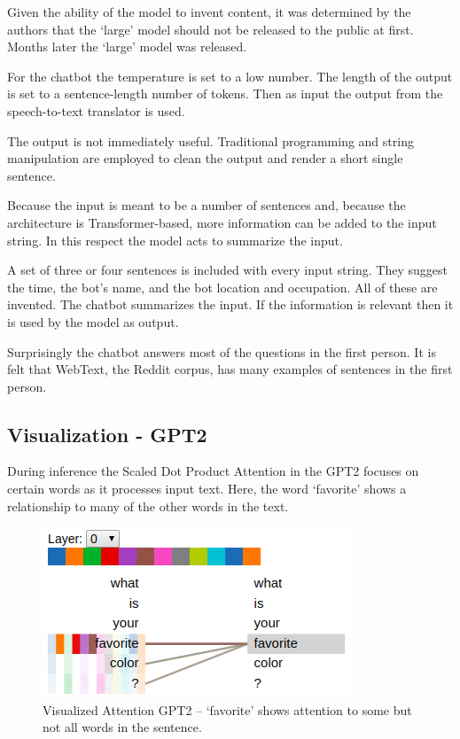 Given the ability of the model to invent content, it was determined by the authors that the `large' model should not be released to the public at first. Months later the `large' model was released. 

For the chatbot the temperature is set to a low number. The length of the output is set to a sentence-length number of tokens. Then as input the output from the speech-to-text translator is used.

The output is not immediately useful. Traditional programming and string manipulation are employed to clean the output and render a short single sentence. %

Because the input is meant to be a number of sentences and, because the architecture is Transformer-based, more information can be added to the input string. In this respect the model acts to summarize the input. 

A set of three or four sentences is included with every input string. They suggest the time, the bot's name, and the bot location and occupation. All of these are invented. The chatbot summarizes the input. If the information is relevant then it is used by the model as output. %

Surprisingly the chatbot answers most of the questions in the first person. It is felt that WebText, the Reddit corpus, has many examples of sentences in the first person.

\subsection{Visualization - GPT2}

During inference the Scaled Dot Product Attention in the GPT2 focuses on certain words as it processes input text. Here, the word `favorite' shows a relationship to many of the other words in the text.  

\begin{figure}[H]
	\begin{center}
		\includegraphics[scale=2]{Figure_4}
		
		
	\end{center}
	\caption[Visualized Attention GPT2]{Visualized Attention GPT2 -- `favorite' shows attention to some but not all words in the sentence.}
	\label{diagram-vis04}
	
\end{figure}

